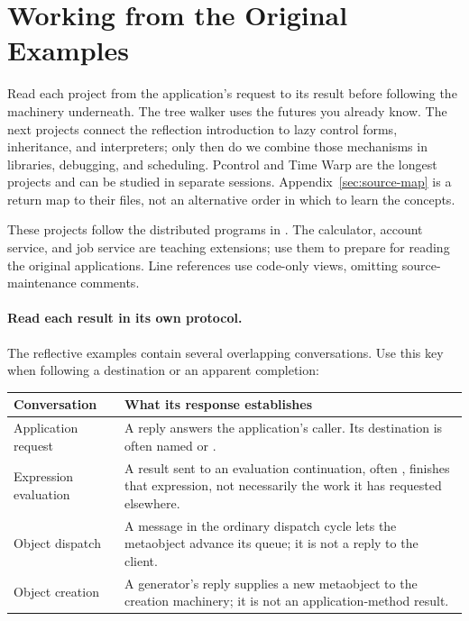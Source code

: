 \section{Working from the Original Examples}
\label{sec:originals}

Read each project from the application's request to its result before
following the machinery underneath. The tree walker uses the futures
you already know. The next projects connect the reflection introduction
to lazy control forms, inheritance, and interpreters; only then do we
combine those mechanisms in libraries, debugging, and scheduling.
Pcontrol and Time Warp are the longest projects and can be studied in
separate sessions. Appendix~\ref{sec:source-map} is a return map to their
files, not an alternative order in which to learn the concepts.

These projects follow the distributed programs in .
The calculator, account service, and job service are teaching extensions;
use them to prepare for reading the original applications.
Line references use code-only views, omitting source-maintenance comments.

\paragraph{Read each result in its own protocol.}
The reflective examples contain several overlapping conversations.
Use this key when following a destination or an apparent completion:

\noindent\begin{minipage}{\linewidth}
\begin{longtable}{L{0.27\textwidth}L{0.63\textwidth}}
\textbf{Conversation} & \textbf{What its response establishes}\\\hline
Application request & A reply answers the application's caller.
Its destination is often named  or .\\
Expression evaluation & A result sent to an evaluation continuation,
often , finishes that expression, not necessarily the work
it has requested elsewhere.\\
Object dispatch & A  message in the ordinary dispatch cycle
lets the metaobject advance its queue; it is not a reply to the client.\\
Object creation & A generator's reply supplies a new metaobject to
the creation machinery; it is not an application-method result.\\
\end{longtable}
\end{minipage}


